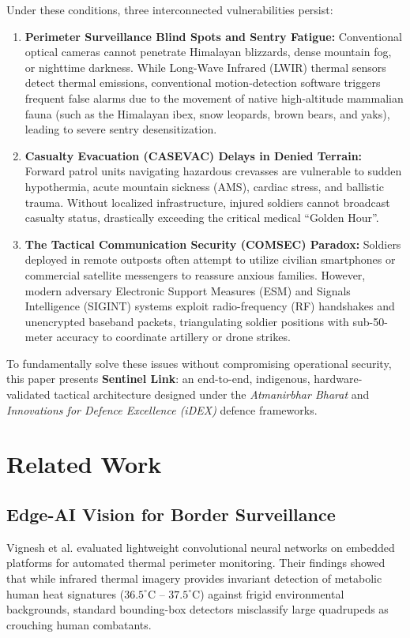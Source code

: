 \documentclass[conference]{IEEEtran}
\begin{document}
Under these conditions, three interconnected vulnerabilities persist:
\begin{enumerate}
    \item \textbf{Perimeter Surveillance Blind Spots and Sentry Fatigue:} Conventional optical cameras cannot penetrate Himalayan blizzards, dense mountain fog, or nighttime darkness. While Long-Wave Infrared (LWIR) thermal sensors detect thermal emissions, conventional motion-detection software triggers frequent false alarms due to the movement of native high-altitude mammalian fauna (such as the Himalayan ibex, snow leopards, brown bears, and yaks), leading to severe sentry desensitization.
    \item \textbf{Casualty Evacuation (CASEVAC) Delays in Denied Terrain:} Forward patrol units navigating hazardous crevasses are vulnerable to sudden hypothermia, acute mountain sickness (AMS), cardiac stress, and ballistic trauma. Without localized infrastructure, injured soldiers cannot broadcast casualty status, drastically exceeding the critical medical ``Golden Hour''.
    \item \textbf{The Tactical Communication Security (COMSEC) Paradox:} Soldiers deployed in remote outposts often attempt to utilize civilian smartphones or commercial satellite messengers to reassure anxious families. However, modern adversary Electronic Support Measures (ESM) and Signals Intelligence (SIGINT) systems exploit radio-frequency (RF) handshakes and unencrypted baseband packets, triangulating soldier positions with sub-50-meter accuracy to coordinate artillery or drone strikes.
\end{enumerate}

To fundamentally solve these issues without compromising operational security, this paper presents \textbf{Sentinel Link}: an end-to-end, indigenous, hardware-validated tactical architecture designed under the \textit{Atmanirbhar Bharat} and \textit{Innovations for Defence Excellence (iDEX)} defence frameworks.

\section{Related Work}
\subsection{Edge-AI Vision for Border Surveillance}
Vignesh et al. \cite{vignesh2023} evaluated lightweight convolutional neural networks on embedded platforms for automated thermal perimeter monitoring. Their findings showed that while infrared thermal imagery provides invariant detection of metabolic human heat signatures ($36.5^\circ$C -- $37.5^\circ$C) against frigid environmental backgrounds, standard bounding-box detectors misclassify large quadrupeds as crouching human combatants. 
\end{document}
